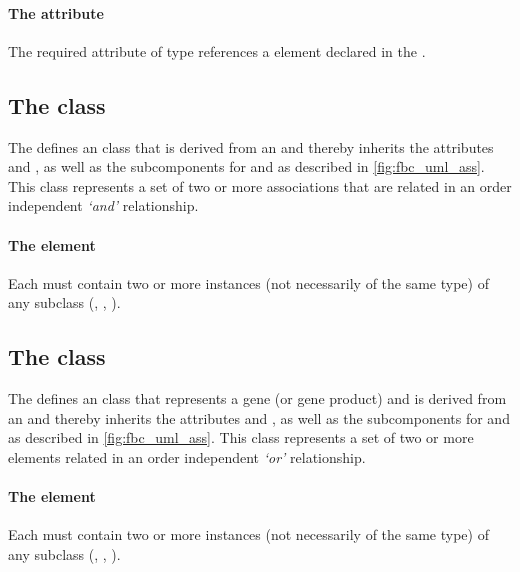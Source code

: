 \paragraph{The  attribute}
The required  attribute of type %
references a \GeneProduct element declared in the \ListOfGeneProducts.
\pagebreak
\subsection{The \FBC {} class}
\label{and-class}

The \FBCPackage defines an \GeneAnd class that is derived from
an \Association and thereby inherits the \SBase attributes 
and , as well as the subcomponents for \Annotation and
\Notes as described in \ref{fig:fbc_uml_ass}. This class represents a
set of two or more associations that are related in an order independent
\emph{`and'} relationship.

\paragraph{The  element}
Each \GeneAnd must contain two or more instances (not necessarily of
the same type) of any \Association subclass (\GeneAnd, \GeneOr,
\GeneProductRef).


\subsection{The \FBC {} class}
\label{or-class}

The \FBCPackage defines an \GeneOr class that represents a gene
(or gene product) and is derived from an \Association and thereby inherits
the \SBase attributes  and , as well as the
subcomponents for \Annotation and \Notes as described in \ref{fig:fbc_uml_ass}.
This class represents a set of two or more \Association elements related
in an order independent \emph{`or'} relationship.

\paragraph{The  element}
Each \GeneOr must contain two or more instances (not necessarily of the
same type) of any \Association subclass (\GeneAnd, \GeneOr, \GeneProductRef).
%
